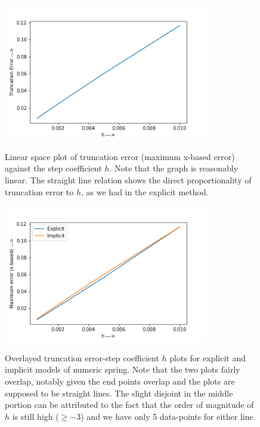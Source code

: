 \documentclass{report}
\begin{document}
\begin{figure}[H]
	\centering
	\includegraphics[width = 0.8\textwidth]{trI.png}
	\label{loglogi}
	\caption{Linear space plot of truncation error (maximum x-based error) against the step coefficient $h$. Note that the graph is reasonably linear. The straight line relation shows the direct proportionality of truncation error to $h$, as we had in the explicit method.}
\end{figure}
\begin{figure}[H]
	\centering
	\includegraphics[width = 0.8\textwidth]{trC.png}
	\label{compareTR}
	\caption{Overlayed truncation error-step coefficient $h$ plots for explicit and implicit models of numeric spring. Note that the two plots fairly overlap, notably given the end points overlap and the plots are supposed to be straight lines. The slight disjoint in the middle portion can be attributed to the fact that the order of magnitude of $h$ is still high ($\geq-3$) and we have only 5 data-points for either line.}
\end{figure}
\end{document}
